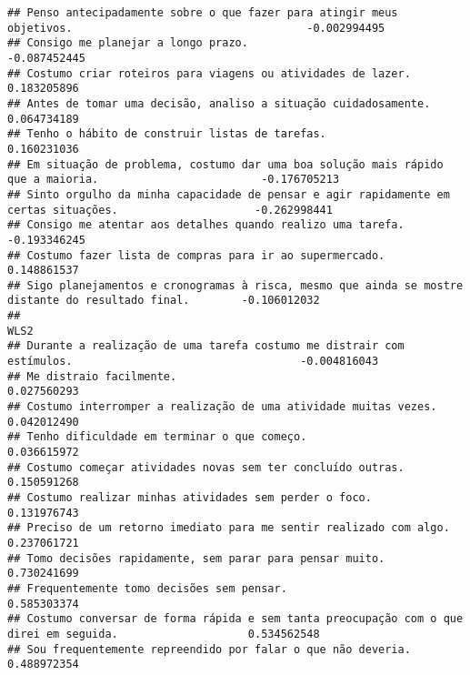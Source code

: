 \documentclass[
]{article}
\begin{document}
\begin{verbatim}
## Penso antecipadamente sobre o que fazer para atingir meus objetivos.                                    -0.002994495
## Consigo me planejar a longo prazo.                                                                      -0.087452445
## Costumo criar roteiros para viagens ou atividades de lazer.                                              0.183205896
## Antes de tomar uma decisão, analiso a situação cuidadosamente.                                           0.064734189
## Tenho o hábito de construir listas de tarefas.                                                           0.160231036
## Em situação de problema, costumo dar uma boa solução mais rápido que a maioria.                         -0.176705213
## Sinto orgulho da minha capacidade de pensar e agir rapidamente em certas situações.                     -0.262998441
## Consigo me atentar aos detalhes quando realizo uma tarefa.                                              -0.193346245
## Costumo fazer lista de compras para ir ao supermercado.                                                  0.148861537
## Sigo planejamentos e cronogramas à risca, mesmo que ainda se mostre distante do resultado final.        -0.106012032
##                                                                                                                 WLS2
## Durante a realização de uma tarefa costumo me distrair com estímulos.                                   -0.004816043
## Me distraio facilmente.                                                                                  0.027560293
## Costumo interromper a realização de uma atividade muitas vezes.                                          0.042012490
## Tenho dificuldade em terminar o que começo.                                                              0.036615972
## Costumo começar atividades novas sem ter concluído outras.                                               0.150591268
## Costumo realizar minhas atividades sem perder o foco.                                                    0.131976743
## Preciso de um retorno imediato para me sentir realizado com algo.                                        0.237061721
## Tomo decisões rapidamente, sem parar para pensar muito.                                                  0.730241699
## Frequentemente tomo decisões sem pensar.                                                                 0.585303374
## Costumo conversar de forma rápida e sem tanta preocupação com o que direi em seguida.                    0.534562548
## Sou frequentemente repreendido por falar o que não deveria.                                              0.488972354

\end{verbatim}
\end{document}
